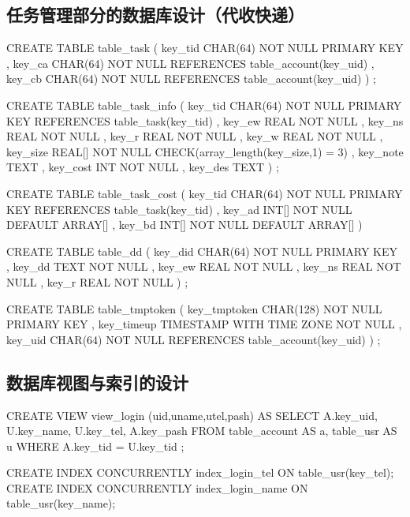 \subsection{任务管理部分的数据库设计（代收快递）}
\begin{sql}[caption=创建任务关联表 table\_task]
    CREATE TABLE table_task
        ( key_tid CHAR(64) NOT NULL PRIMARY KEY
        , key_ca CHAR(64) NOT NULL REFERENCES table_account(key_uid)
        , key_cb CHAR(64) NOT NULL REFERENCES table_account(key_uid)
        )
    ;
\end{sql}

\begin{sql}[caption=创建任务信息表 table\_task\_info]
    CREATE TABLE table_task_info
        ( key_tid CHAR(64) NOT NULL PRIMARY KEY REFERENCES table_task(key_tid)
        , key_ew REAL NOT NULL
        , key_ns REAL NOT NULL
        , key_r REAL NOT NULL
        , key_w REAL NOT NULL
        , key_size REAL[] NOT NULL CHECK(array_length(key_size,1) = 3)
        , key_note TEXT
        , key_cost INT NOT NULL
        , key_des TEXT
        )
    ;
\end{sql}

\begin{sql}[caption=创建任务议价表 table\_task\_cost]
    CREATE TABLE table_task_cost
        ( key_tid CHAR(64) NOT NULL PRIMARY KEY REFERENCES table_task(key_tid)
        , key_ad INT[] NOT NULL DEFAULT ARRAY[]
        , key_bd INT[] NOT NULL DEFAULT ARRAY[]
        )
\end{sql}

\begin{sql}[caption=创建可代收表 table\_dd]
    CREATE TABLE table_dd
        ( key_did CHAR(64) NOT NULL PRIMARY KEY
        , key_dd TEXT NOT NULL
        , key_ew REAL NOT NULL
        , key_ns REAL NOT NULL
        , key_r REAL NOT NULL
        )
    ;
\end{sql}

\begin{sql}[caption=创建用户临时Token表 table\_tmptoken]
    CREATE TABLE table_tmptoken
        ( key_tmptoken CHAR(128) NOT NULL PRIMARY KEY
        , key_timeup TIMESTAMP WITH TIME ZONE NOT NULL
        , key_uid CHAR(64) NOT NULL REFERENCES table_account(key_uid)
        )
    ;
\end{sql}
\subsection{数据库视图与索引的设计}
\begin{sql}[caption=创建登陆视图 view\_login]
	CREATE VIEW view_login (uid,uname,utel,pash) AS
		SELECT A.key_uid, U.key_name, U.key_tel, A.key_pash
		FROM table_account AS a, table_usr AS u
		WHERE A.key_tid = U.key_tid
	;
\end{sql}
\begin{sql}[caption=创建登陆用的索引]
	CREATE INDEX CONCURRENTLY index_login_tel ON table_usr(key_tel);
	CREATE INDEX CONCURRENTLY index_login_name ON table_usr(key_name);
\end{sql}
\begin{sql}[caption=创建]
\end{sql}

